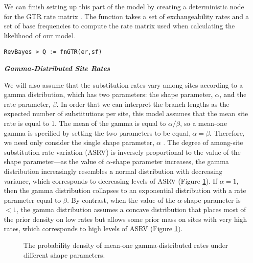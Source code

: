 We can finish setting up this part of the model by creating a deterministic node for the GTR rate matrix . 
The  function takes a set of exchangeability rates and a set of base frequencies to compute the rate matrix used when calculating the likelihood of our model.
{\tt \begin{snugshade*}
\begin{lstlisting}
RevBayes > Q := fnGTR(er,sf)
\end{lstlisting}
\end{snugshade*}}


\textbf{\textit{Gamma-Distributed Site Rates}}


We will also assume that the substitution rates vary among sites according to a gamma distribution, which has two parameters: the shape parameter, $\alpha$, and the rate parameter, $\beta$. 
In order that we can interpret the branch lengths as the expected number of substitutions per site, this model assumes that the mean site rate is equal to 1.
The mean of the gamma is equal to $\alpha/\beta$, so a mean-one gamma is specified by setting the two parameters to be equal, $\alpha=\beta$.
Therefore, we need only consider the single shape parameter, $\alpha$ \citep{yang94a}. 
The degree of among-site substitution rate variation (ASRV) is inversely proportional to the value of the shape parameter---as the value of $\alpha$-shape parameter increases, the gamma distribution increasingly resembles a normal distribution with decreasing variance, which corresponds to decreasing levels of ASRV (Figure \ref{asrhGammaFig}).
If $\alpha = 1$, then the gamma distribution collapses to an exponential distribution with a rate parameter equal to $\beta$.
By contrast, when the value of the $\alpha$-shape parameter is $< 1$, the gamma distribution assumes a concave distribution that places most of the prior density on low rates but allows some prior mass on sites with very high rates, which corresponds to high levels of ASRV (Figure \ref{asrhGammaFig}).

\begin{figure}[h]
\centering
{}
\caption{\small The probability density of mean-one gamma-distributed rates under different shape parameters.}
\label{asrhGammaFig}
\end{figure}


